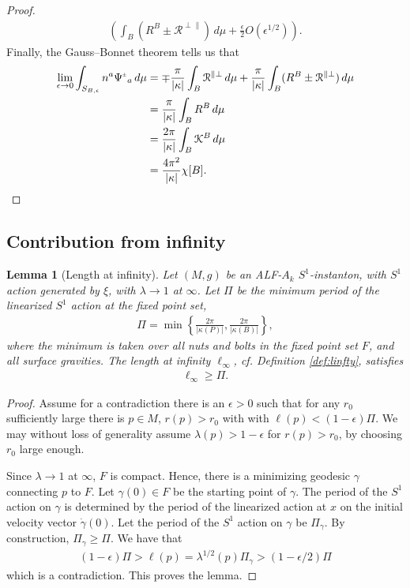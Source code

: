 \documentclass[a4paper,11pt,reqno]{amsart}
\newcommand{\nut}{P}
\newcommand{\bolt}{B}
\newcommand{\cR}{\mathcal{R}}
\theoremstyle{plain}
\newtheorem{lemma}[thm]{Lemma}
\newcommand{\PM}[1]{{{#1}^{\hspace{-.5pt}\scaleto{\pm}{3.5pt}}}}
\numberwithin{equation}{section}
\newcommand{\eps}{\epsilon}
\newcommand{\Fixed}{F}
\begin{document}
\begin{proof}
\begin{align}
\left(
\int_\bolt
( R^\bolt \pm \cR^{\perp\parallel} ) \, d\mu
+ \frac{\epsilon}{2} O(\epsilon^{1/2})
\right).
\end{align}
Finally, the Gauss--Bonnet theorem tells us that
\begin{align}
\lim_{\eps \to 0} 
\int_{S_{\bolt,\epsilon}} n^a \PM\Psi_a \, d\mu
&=
\mp \frac{\pi}{|\kappa|} \int_\bolt \cR^{\parallel\perp} \, d\mu
+ \frac{\pi}{|\kappa|} 
\int_\bolt (R^\bolt \pm \cR^{\parallel\perp}) \, d\mu \\
&= \frac{\pi}{|\kappa|} \int_\bolt R^\bolt \, d\mu \\
&= \frac{2\pi}{|\kappa|} \int_\bolt \mathcal{K}^\bolt \, d\mu \\
&= \frac{4\pi^2}{|\kappa|} \chi[\bolt]. 
\end{align}
\end{proof} 


\subsection{Contribution from infinity} \label{sec:infterm}

\begin{lemma}[Length at infinity] \label{lem:ellinfty} 
Let $(M,g)$ be an ALF-$A_k$ $S^1$-instanton, with $S^1$ action generated by $\xi$, with $\lambda \to 1$ at $\infty$. 
Let  $\Pi$ be the minimum period of the linearized $S^1$ action at the fixed point set, 
\begin{align} 
\Pi = \min \left \{ \frac{2\pi}{|\kappa(\nut)|}, \frac{2\pi}{|\kappa(\bolt)|} \right \},  
\end{align} 
where the minimum is taken over all nuts and bolts in the fixed point set $F$, and all surface gravities. 
The length at infinity $\ell_\infty$, cf. Definition \ref{def:linfty}, satisfies 
\begin{align} \label{eq:ellinfty}
\ell_\infty \geq \Pi. 
%
\end{align} 
\end{lemma} 

\begin{proof} 
%
Assume for a contradiction there is an $\eps > 0$ such that for any $r_0$ sufficiently large there is $p \in M$, $r(p) > r_0$ with with $\ell(p) < (1-\eps)\Pi$. We may without loss of generality assume $\lambda(p) > 1-\eps$ for $r(p) > r_0$, by choosing $r_0$ large enough. 

Since $\lambda \to 1$ at $\infty$, $\Fixed$ is compact. Hence, there is a minimizing geodesic $\gamma$ connecting $p$ to  $\Fixed$. Let $\gamma(0) \in \Fixed$ be the starting point of $\gamma$. The period of the $S^1$ action on $\gamma$ is determined by the period of the linearized action at $x$ on the initial velocity vector $\dot \gamma(0)$. Let the period of the $S^1$ action on $\gamma$ be $\Pi_\gamma$. By construction, $\Pi_\gamma \geq \Pi$. We have that 
\begin{align} 
(1-\eps) \Pi > \ell(p) =\lambda^{1/2}(p) \Pi_\gamma > (1-\eps/2)\Pi
\end{align} 
which is a contradiction. This proves the lemma.
\end{proof} 
\end{document}
